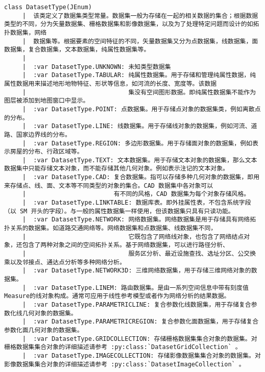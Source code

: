 \documentclass[11pt]{article}
\begin{document}
\begin{Verbatim}[commandchars=\\\{\}]
    class DatasetType(JEnum)
     |  该类定义了数据集类型常量。数据集一般为存储在一起的相关数据的集合；根据数据类型的不同，分为矢量数据集、栅格数据集和影像数据集，以及为了处理特定问题而设计的如拓扑数据集，网络
     |  数据集等。根据要素的空间特征的不同，矢量数据集又分为点数据集，线数据集，面数据集，复合数据集，文本数据集，纯属性数据集等。
     |  
     |  :var DatasetType.UNKNOWN: 未知类型数据集
     |  :var DatasetType.TABULAR: 纯属性数据集。用于存储和管理纯属性数据，纯属性数据用来描述地形地物特征、形状等信息，如河流的长度、宽度等。该数据
     |                            集没有空间图形数据。即纯属性数据集不能作为图层被添加到地图窗口中显示。
     |  :var DatasetType.POINT: 点数据集。用于存储点对象的数据集类，例如离散点的分布。
     |  :var DatasetType.LINE: 线数据集。用于存储线对象的数据集，例如河流、道路、国家边界线的分布。
     |  :var DatasetType.REGION: 多边形数据集。用于存储面对象的数据集，例如表示房屋的分布、行政区域等。
     |  :var DatasetType.TEXT: 文本数据集。用于存储文本对象的数据集，那么文本数据集中只能存储文本对象，而不能存储其他几何对象。例如表示注记的文本对象。
     |  :var DatasetType.CAD: 复合数据集。指可以存储多种几何对象的数据集，即用来存储点、线、面、文本等不同类型的对象的集合。CAD 数据集中各对象可以
     |                        有不同的风格，CAD 数据集为每个对象存储风格。
     |  :var DatasetType.LINKTABLE: 数据库表。即外挂属性表，不包含系统字段（以 SM 开头的字段）。与一般的属性数据集一样使用，但该数据集只具有只读功能。
     |  :var DatasetType.NETWORK: 网络数据集。网络数据集是用于存储具有网络拓扑关系的数据集。如道路交通网络等。网络数据集和点数据集、线数据集不同，
     |                            它既包含了网络线对象，也包含了网络结点对象，还包含了两种对象之间的空间拓扑关系。基于网络数据集，可以进行路径分析、
     |                            服务区分析、最近设施查找、选址分区、公交换乘以及邻接点、通达点分析等多种网络分析。
     |  :var DatasetType.NETWORK3D: 三维网络数据集，用于存储三维网络对象的数据集。
     |  :var DatasetType.LINEM: 路由数据集。是由一系列空间信息中带有刻度值Measure的线对象构成。通常可应用于线性参考模型或者作为网络分析的结果数据。
     |  :var DatasetType.PARAMETRICLINE: 复合参数化线数据集，用于存储复合参数化线几何对象的数据集。
     |  :var DatasetType.PARAMETRICREGION: 复合参数化面数据集，用于存储复合参数化面几何对象的数据集。
     |  :var DatasetType.GRIDCOLLECTION: 存储栅格数据集集合对象的数据集。对栅格数据集集合对象的详细描述请参考 :py:class:`DatasetGridCollection` 。
     |  :var DatasetType.IMAGECOLLECTION: 存储影像数据集集合对象的数据集。对影像数据集集合对象的详细描述请参考 :py:class:`DatasetImageCollection` 。

\end{Verbatim}
\end{document}
